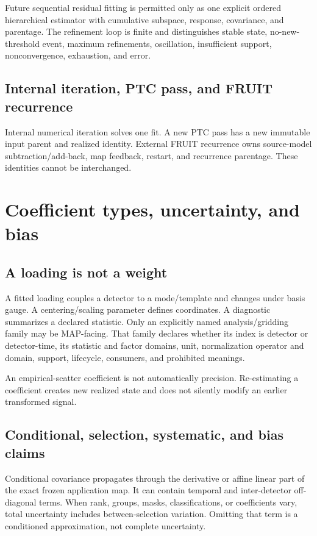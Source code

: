 \documentclass[11pt]{article}
\begin{document}
Future sequential residual fitting is permitted only as one explicit ordered
hierarchical estimator with cumulative subspace, response, covariance, and
parentage. The refinement loop is finite and distinguishes stable state,
no-new-threshold event, maximum refinements, oscillation, insufficient
support, nonconvergence, exhaustion, and error.

\subsection{Internal iteration, PTC pass, and FRUIT recurrence}

Internal numerical iteration solves one fit. A new PTC pass has a new
immutable input parent and realized identity. External FRUIT recurrence owns
source-model subtraction/add-back, map feedback, restart, and recurrence
parentage. These identities cannot be interchanged.

\section{Coefficient types, uncertainty, and bias}
\label{sec:science-uncertainty}

\subsection{A loading is not a weight}

A fitted loading couples a detector to a mode/template and changes under basis
gauge. A centering/scaling parameter defines coordinates. A diagnostic
summarizes a declared statistic. Only an explicitly named analysis/gridding
family may be MAP-facing. That family declares whether its index is detector
or detector-time, its statistic and factor domains, unit, normalization
operator and domain, support, lifecycle, consumers, and prohibited meanings.

An empirical-scatter coefficient is not automatically precision. Re-estimating
a coefficient creates new realized state and does not silently modify an
earlier transformed signal.

\subsection{Conditional, selection, systematic, and bias claims}

Conditional covariance propagates through the derivative or affine linear
part of the exact frozen application map. It can contain temporal and
inter-detector off-diagonal terms. When rank, groups, masks,
classifications, or coefficients vary, total uncertainty includes
between-selection variation. Omitting that term is a conditioned
approximation, not complete uncertainty.
\end{document}
